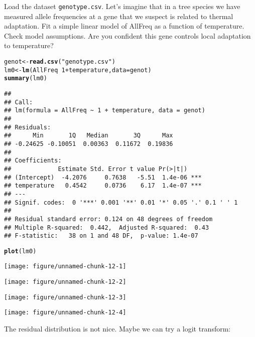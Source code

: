 \documentclass[12pt,a4paper]{scrartcl}\usepackage[]{graphicx}\usepackage[]{color}
\makeatletter
\def\maxwidth{ %
  \ifdim\Gin@nat@width>\linewidth
    \linewidth
  \else
    \Gin@nat@width
  \fi
}
\newcommand{\hlnum}[1]{\textcolor[rgb]{0.686,0.059,0.569}{#1}}%
\newcommand{\hlstr}[1]{\textcolor[rgb]{0.192,0.494,0.8}{#1}}%
\newcommand{\hlopt}[1]{\textcolor[rgb]{0,0,0}{#1}}%
\newcommand{\hlstd}[1]{\textcolor[rgb]{0.345,0.345,0.345}{#1}}%
\newcommand{\hlkwb}[1]{\textcolor[rgb]{0.69,0.353,0.396}{#1}}%
\newcommand{\hlkwc}[1]{\textcolor[rgb]{0.333,0.667,0.333}{#1}}%
\newcommand{\hlkwd}[1]{\textcolor[rgb]{0.737,0.353,0.396}{\textbf{#1}}}%
\newenvironment{kframe}{%
 \def\at@end@of@kframe{}%
 \ifinner\ifhmode%
  \def\at@end@of@kframe{\end{minipage}}%
  \begin{minipage}{\columnwidth}%
 \fi\fi%
 \def\FrameCommand##1{\hskip\@totalleftmargin \hskip-\fboxsep
 \colorbox{shadecolor}{##1}\hskip-\fboxsep
     \hskip-\linewidth \hskip-\@totalleftmargin \hskip\columnwidth}%
 \MakeFramed {\advance\hsize-\width
   \@totalleftmargin\z@ \linewidth\hsize
   \@setminipage}}%
 {\par\unskip\endMakeFramed%
 \at@end@of@kframe}
\newenvironment{knitrout}{}{} %
\makeatother
\begin{document}
\begin{Exercise}[difficulty=2, title={Genetic isolation distance or adaptation?}]


Load the dataset \texttt{genotype.csv}. Let's imagine that in a tree species we have measured allele frequencies at a gene that we suspect is related to thermal adaptation. Fit a simple linear model of AllFreq as a function of temperature. Check model assumptions. Are you confident this gene controls local adaptation to temperature?
\end{Exercise}
\begin{Answer}
\begin{knitrout}
\color{fgcolor}\begin{kframe}
\begin{alltt}
\hlstd{genot} \hlkwb{<-} \hlkwd{read.csv}\hlstd{(}\hlstr{"genotype.csv"}\hlstd{)}
\hlstd{lm0} \hlkwb{<-} \hlkwd{lm}\hlstd{(AllFreq} \hlopt{~} \hlnum{1} \hlopt{+} \hlstd{temperature,} \hlkwc{data}\hlstd{=genot)}
\hlkwd{summary}\hlstd{(lm0)}
\end{alltt}
\begin{verbatim}
## 
## Call:
## lm(formula = AllFreq ~ 1 + temperature, data = genot)
## 
## Residuals:
##      Min       1Q   Median       3Q      Max 
## -0.24625 -0.10051  0.00363  0.11672  0.19836 
## 
## Coefficients:
##             Estimate Std. Error t value Pr(>|t|)    
## (Intercept)  -4.2076     0.7638   -5.51  1.4e-06 ***
## temperature   0.4542     0.0736    6.17  1.4e-07 ***
## ---
## Signif. codes:  0 '***' 0.001 '**' 0.01 '*' 0.05 '.' 0.1 ' ' 1
## 
## Residual standard error: 0.124 on 48 degrees of freedom
## Multiple R-squared:  0.442,	Adjusted R-squared:  0.43 
## F-statistic:   38 on 1 and 48 DF,  p-value: 1.4e-07
\end{verbatim}
\begin{alltt}
\hlkwd{plot}\hlstd{(lm0)}
\end{alltt}
\end{kframe}
\texttt{[image: figure/unnamed-chunk-12-1]} 

\texttt{[image: figure/unnamed-chunk-12-2]} 

\texttt{[image: figure/unnamed-chunk-12-3]} 

\texttt{[image: figure/unnamed-chunk-12-4]} 

\end{knitrout}

The residual distribution is not nice. Maybe we can try a logit transform:


\end{Answer}
\end{document}
